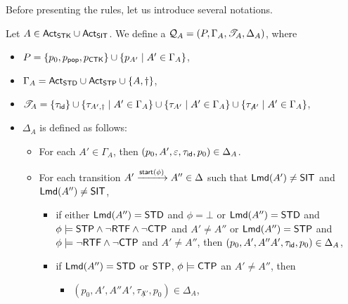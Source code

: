 Before presenting the rules, let us introduce several notations. 

Let $A\in{\sf Act}_{\mathsf{STK}}\cup{\sf Act}_{\mathsf{SIT}}$. We define a {\WOTrPDS} ${\mathcal{Q} }_{A} = (P, \Gamma_{A}, {\mathscr{T} }_{A},\Delta_{A} )$, where
\begin{itemize}
\item $P = \{p_0, p_{\mathsf{pop}}, p_{{\sf CTK}}\}\cup\{p_{A'}\mid A'\in\Gamma_A\}$,
\item $\Gamma_{A} = {\sf Act}_{\mathsf{STD}}\cup{\sf Act}_{\mathsf{STP}} \cup \{A,\dag\}$, 
\item ${\mathscr{T} }_{A} = \{\tau_{\mathsf{id}} \}\cup \{\tau_{A', \dag} \mid A' \in \Gamma_A\} \cup \{\tau_{A'} \mid A' \in \Gamma_A\}  \cup \{\tau_{\not A'} \mid A' \in \Gamma_A\}$,
\item $\Delta_{A}$ is defined as follows:
        \begin{itemize}
            \item For each $A' \in \Gamma_A$, then $(p_0, A', \varepsilon, \tau_{\mathsf{id}}, p_0) \in \Delta_{A}$.
			\item For each transition $A'\xrightarrow{{\mathsf{start} }(\phi)}A''\in\Delta$ such that ${\sf Lmd}(A')\neq \mathsf{SIT}$ and ${\sf Lmd}(A'')\neq \mathsf{SIT}$,
			\begin{itemize}
                \item if either ${\sf Lmd}(A'') = \mathsf{STD}$ and $\phi = \bot$ or ${\sf Lmd}(A'') = \mathsf{STD}$ and $\phi\models{\sf STP}\wedge\neg{\sf RTF}\wedge\neg{\sf CTP}$ and $A'\neq A''$ or ${\sf Lmd}(A'') = \mathsf{STP}$ and $\phi\models\neg{\sf RTF}\wedge\neg{\sf CTP}$ and $A'\neq A''$,
                then $(p_0, A', A''A', \tau_{\mathsf{id}}, p_0) \in \Delta_{A}$, 
				\item if ${\sf Lmd}(A'') = \mathsf{STD}$ or $\mathsf{STP}$, $\phi\models{\sf CTP}$ an $A'\neq A''$, then 
				\begin{itemize}
					\item $(p_0, A', A''A', \tau_{\not A'}, p_0) \in \Delta_{A}$, 

\end{itemize}
\end{itemize}
\end{itemize}
\end{itemize}
